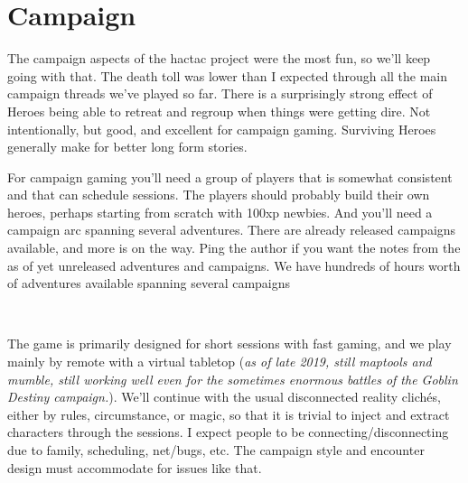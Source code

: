 

\cleardoublepage

\chapter*{Campaign}


The campaign aspects of the hactac project were the most fun, so we'll keep going with that. The death toll was lower than I expected through all the main campaign threads we've played so far. There is a surprisingly strong effect of Heroes being able to retreat and regroup when things were getting dire. Not intentionally, but good, and excellent for campaign gaming. Surviving Heroes generally make for better long form stories. 

For campaign gaming you'll need a group of players that is somewhat consistent and that can schedule sessions. The players should probably build their own heroes, perhaps starting from scratch with 100xp newbies. And you'll need a campaign arc spanning several adventures. There are already released campaigns available, and more is on the way. Ping the author if you want the notes from the as of yet unreleased adventures and campaigns. We have hundreds of hours worth of adventures available spanning several campaigns

\

The game is primarily designed for short sessions with fast gaming, and we play mainly by remote with a virtual tabletop (\emph{as of late 2019, still maptools and mumble, still working well even for the sometimes enormous battles of the Goblin Destiny campaign.}). We'll continue with the usual disconnected reality clichés, either by rules, circumstance, or magic, so that it is trivial to inject and extract characters through the sessions. I expect people to be connecting/disconnecting due to family, scheduling, net/bugs, etc. The campaign style and encounter design must accommodate for issues like that.





